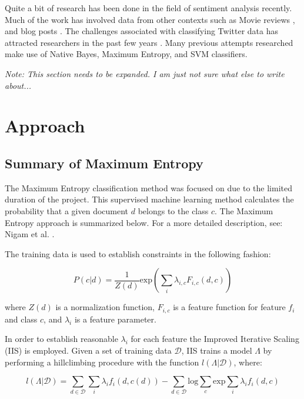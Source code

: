 \documentclass[12pt]{article}
\begin{document}
Quite a bit of research has been done in the field of sentiment analysis
recently. Much of the work has involved data from other contexts such as Movie
reviews \cite{Pang2002}, and blog posts \cite{Melville2009}. The challenges
associated with classifying Twitter data has attracted researchers in the past
few years \cite{Jianfeng2013} \cite{Barbosa2010} \cite{Gokulakrishnan2012}.
Many previous attempts researched make use of Native Bayes, Maximum Entropy,
and SVM classifiers.

\textit{Note: This section needs to be expanded. I am just not sure what else to write about...}


\section{Approach}

\subsection{Summary of Maximum Entropy}

The Maximum Entropy classification method was focused on due to the limited
duration of the project. This supervised machine learning method calculates the
probability that a given document $d$ belongs to the class $c$.  The Maximum
Entropy approach is summarized below. For a more detailed description, see:
Nigam et al. \cite{Nigam1999}.

The training data is used to establish constraints in the following fashion:

\begin{equation}
    P(c | d) = \frac{1}{Z(d)} \mathrm{exp}(\sum\limits_{i} \lambda _{i,c} F_{i,c}(d,c) )
\end{equation}

where $Z(d)$ is a normalization function, $F_{i,c}$ is a feature function for
feature $f_{i}$ and class $c$, and $\lambda_{i}$ is a feature parameter.

In order to establish reasonable $\lambda_{i}$ for each feature the Improved
Iterative Scaling (IIS) is employed. Given a set of training data
$\mathcal{D}$, IIS trains a model $\Lambda$ by performing a hillclimbing
procedure with the function $l(\Lambda|\mathcal{D})$, where:

\begin{equation}
    l(\Lambda | \mathcal{D}) = \sum\limits_{d\in\mathcal{D}} \sum\limits_{i}
    \lambda_{i} f_{i}(d,c(d)) - \sum\limits_{d\in\mathcal{D}} \mathrm{log}
    \sum\limits_{c} \mathrm{exp} \sum\limits_{i} \lambda_{i} f_{i}(d,c)
\end{equation}
\end{document}
